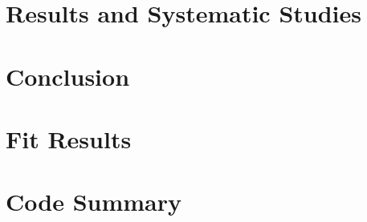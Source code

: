 \documentclass[final]{memoir}
\begin{document}
\chapter{Results and Systematic Studies}

\chapter{Conclusion}


\appendix
\chapter{Fit Results}

\chapter{Code Summary}


\backmatter
\printbibliography
\newpage
\end{document}
